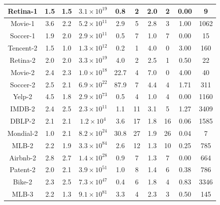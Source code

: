 \documentclass[]{article}
\begin{document}
\begin{table}
\begin{adjustbox}{width=1\textwidth}
\begin{tabular}{|c|c|c|c|c|c|c|c|c|c|}
                    Retina-1 & 1.5 & 1.5 & $3.1 \times 10^{19}$ & 0.8 & 2 & 2.0 & 2 & 0.00 & 9 \\
                    \hline
                    Movie-1 & 3.6 & 2.2 & $5.2 \times 10^{11}$ & 2.9 & 5 & 2.8 & 3 & 1.00 & 1062 \\
                    \hline
                    Soccer-1 & 1.9 & 2.0 & $2.9 \times 10^{11}$ & 0.5 & 7 & 1.0 & 7 & 0.00 & 15 \\
                    \hline
                    Tencent-2 & 1.5 & 1.0 & $1.3 \times 10^{12}$ & 0.2 & 1 & 4.0 & 0 & 3.00 & 160 \\
                    \hline
                    Retina-2 & 2.0 & 2.0 & $3.3 \times 10^{19}$ & 4.0 & 2 & 2.5 & 1 & 0.50 & 22 \\
                    \hline
                    Movie-2 & 2.4 & 2.3 & $1.0 \times 10^{18}$ & 22.7 & 4 & 7.0 & 0 & 4.00 & 40 \\
                    \hline
                    Soccer-2 & 2.5 & 2.1 & $6.9 \times 10^{22}$ & 87.9 & 7 & 4.4 & 4 & 1.71 & 311 \\
                    \hline
                    Yelp-2 & 4.5 & 1.8 & $2.9 \times 10^{73}$ & 0.5 & 4 & 1.0 & 4 & 0.00 & 1160 \\
                    \hline
                    IMDB-2 & 2.4 & 2.5 & $2.3 \times 10^{11}$ & 1.1 & 11 & 3.1 & 5 & 1.27 & 3409 \\
                    \hline
                    DBLP-2 & 2.1 & 2.1 & $1.2 \times 10^{4}$ & 3.6 & 17 & 1.8 & 16 & 0.06 & 1585 \\
                    \hline
                    Mondial-2 & 1.0 & 2.1 & $8.2 \times 10^{24}$ & 30.8 & 27 & 1.9 & 26 & 0.04 & 7 \\
                    \hline
                    MLB-2 & 2.2 & 1.9 & $3.3 \times 10^{84}$ & 2.6 & 12 & 1.3 & 10 & 0.25 & 785 \\
                    \hline
                    Airbnb-2 & 2.8 & 2.7 & $1.4 \times 10^{28}$ & 0.9 & 7 & 1.3 & 7 & 0.00 & 664 \\
                    \hline
                    Patent-2 & 2.0 & 2.1 & $3.9 \times 10^{51}$ & 1.0 & 8 & 1.4 & 6 & 0.38 & 786 \\
                    \hline
                    Bike-2 & 2.3 & 2.5 & $7.3 \times 10^{47}$ & 0.4 & 6 & 1.8 & 4 & 0.83 & 3346 \\
                    \hline
                    MLB-3 & 2.2 & 1.3 & $9.1 \times 10^{81}$ & 3.3 & 4 & 2.3 & 3 & 0.50 & 145 \\

\end{tabular}
\end{adjustbox}
\end{table}
\end{document}
